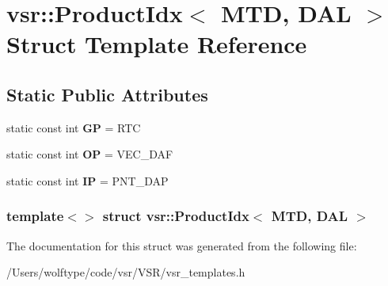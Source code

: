 \hypertarget{structvsr_1_1_product_idx_3_01_m_t_d_00_01_d_a_l_01_4}{\section{vsr\-:\-:Product\-Idx$<$ M\-T\-D, D\-A\-L $>$ Struct Template Reference}
\label{structvsr_1_1_product_idx_3_01_m_t_d_00_01_d_a_l_01_4}
}
\subsection*{Static Public Attributes}
\begin{DoxyCompactItemize}
\item 
\hypertarget{structvsr_1_1_product_idx_3_01_m_t_d_00_01_d_a_l_01_4_a218b314c8d9f089033f9dd81c5163c2a}{static const int {\bfseries G\-P} = R\-T\-C}\label{structvsr_1_1_product_idx_3_01_m_t_d_00_01_d_a_l_01_4_a218b314c8d9f089033f9dd81c5163c2a}

\item 
\hypertarget{structvsr_1_1_product_idx_3_01_m_t_d_00_01_d_a_l_01_4_aa4fa0095a02051605c216a85f8b3f3ca}{static const int {\bfseries O\-P} = V\-E\-C\-\_\-\-D\-A\-F}\label{structvsr_1_1_product_idx_3_01_m_t_d_00_01_d_a_l_01_4_aa4fa0095a02051605c216a85f8b3f3ca}

\item 
\hypertarget{structvsr_1_1_product_idx_3_01_m_t_d_00_01_d_a_l_01_4_a67683ffe48a23aa764f7812cfb406f70}{static const int {\bfseries I\-P} = P\-N\-T\-\_\-\-D\-A\-P}\label{structvsr_1_1_product_idx_3_01_m_t_d_00_01_d_a_l_01_4_a67683ffe48a23aa764f7812cfb406f70}

\end{DoxyCompactItemize}
\subsubsection*{template$<$$>$ struct vsr\-::\-Product\-Idx$<$ M\-T\-D, D\-A\-L $>$}



The documentation for this struct was generated from the following file\-:\begin{DoxyCompactItemize}
\item 
/\-Users/wolftype/code/vsr/\-V\-S\-R/vsr\-\_\-templates.\-h\end{DoxyCompactItemize}
